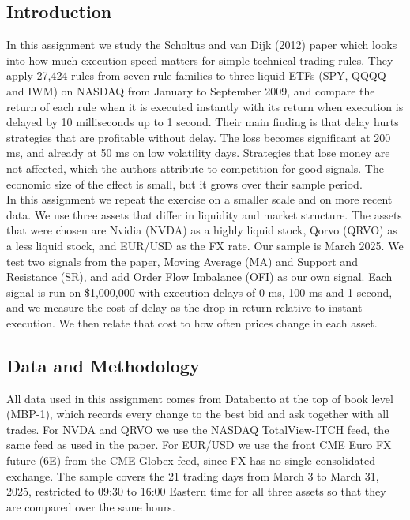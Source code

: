 \documentclass{article}
\begin{document}
\subsection{Introduction}

In this assignment we study the Scholtus and van Dijk (2012) paper which looks into how much execution speed matters for simple technical trading rules. They apply 27,424 rules from seven rule families to three liquid ETFs (SPY, QQQQ and IWM) on NASDAQ from January to September 2009, and compare the return of each rule when it is executed instantly with its return when execution is delayed by 10 milliseconds up to 1 second. Their main finding is that delay hurts strategies that are profitable without delay. The loss becomes significant at 200 ms, and already at 50 ms on low volatility days. Strategies that lose money are not affected, which the authors attribute to competition for good signals. The economic size of the effect is small, but it grows over their sample period.\\

\noindent In this assignment we repeat the exercise on a smaller scale and on more recent data. We use three assets that differ in liquidity and market structure. The assets that were chosen are Nvidia (NVDA) as a highly liquid stock, Qorvo (QRVO) as a less liquid stock, and EUR/USD as the FX rate. Our sample is March 2025. We test two signals from the paper, Moving Average (MA) and Support and Resistance (SR), and add Order Flow Imbalance (OFI) as our own signal. Each signal is run on \$1,000,000 with execution delays of 0 ms, 100 ms and 1 second, and we measure the cost of delay as the drop in return relative to instant execution. We then relate that cost to how often prices change in each asset.

\subsection{Data and Methodology}

All data used in this assignment comes from Databento at the top of book level (MBP-1), which records every change to the best bid and ask together with all trades. For NVDA and QRVO we use the NASDAQ TotalView-ITCH feed, the same feed as used in the paper. For EUR/USD we use the front CME Euro FX future (6E) from the CME Globex feed, since FX has no single consolidated exchange. The sample covers the 21 trading days from March 3 to March 31, 2025, restricted to 09:30 to 16:00 Eastern time for all three assets so that they are compared over the same hours.\\
\end{document}
